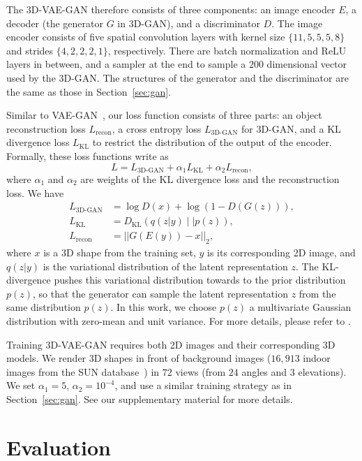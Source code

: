 \documentclass{article}
\newcommand{\sect}[1]{Section~\ref{#1}}
\newcommand{\model}{3D-GAN\xspace}
\newcommand{\vaemodel}{3D-VAE-GAN\xspace}
\newcommand{\presection}{\vspace{-8pt}}
\newcommand{\postsection}{\vspace{-8pt}}
\begin{document}
The \vaemodel therefore consists of three components: an image encoder $E$, a decoder (the generator $G$ in \model), and a discriminator $D$. The image encoder consists of five spatial convolution layers with kernel size $\{11,5,5,5,8\}$ and strides $\{4,2,2,2,1\}$, respectively. There are batch normalization and ReLU layers in between, and a sampler at the end to sample a $200$ dimensional vector used by the \model. The structures of the generator and the discriminator are the same as those in \sect{sec:gan}.

Similar to VAE-GAN~\citep{larsen2015autoencoding}, our loss function consists of three parts: an object reconstruction loss $L_{\text{recon}}$, a cross entropy loss $L_{\text{\model}}$ for \model, and a KL divergence loss $L_{\text{KL}}$ to restrict the distribution of the output of the encoder. Formally, these loss functions write as 
\begin{equation}
\label{eq:vaeloss}
L=L_{\text{\model}}+\alpha_1 L_{\text{KL}}+\alpha_2 L_{\text{recon}},
\end{equation}
where $\alpha_1$ and $\alpha_2$ are weights of the KL divergence loss and the reconstruction loss. We have
\begin{align}
L_{\text{\model}}& = \log D(x) + \log (1-D(G(z))), \\
L_{\text{KL}} &= D_{\text{KL}}(q(z|y)\mid\mid p(z)),\\
L_{\text{recon}}&=||G(E(y)) - x||_2,
\end{align}
where $x$ is a 3D shape from the training set, $y$ is its corresponding 2D image, and $q(z|y)$ is the variational distribution of the latent representation $z$. The KL-divergence pushes this variational distribution towards to the prior distribution $p(z)$, so that the generator can sample the latent representation $z$ from the same distribution $p(z)$. In this work, we choose $p(z)$ a multivariate Gaussian distribution with zero-mean and unit variance. For more details, please refer to \cite{larsen2015autoencoding}.

Training \vaemodel requires both 2D images and their corresponding 3D models. We render 3D shapes in front of background images ($16,913$ indoor images from the SUN database~\citep{SUN}) in $72$ views (from $24$ angles and $3$ elevations). We set $\alpha_1=5$, $\alpha_2=10^{-4}$, and use a similar training strategy as in \sect{sec:gan}. See our supplementary material for more details.


\presection
\section{Evaluation}
\label{sec:results}
\postsection
\end{document}
